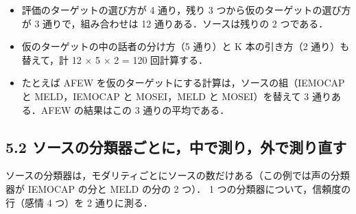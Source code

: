 \documentclass[a4paper,11pt]{ltjsarticle}
\begin{document}
\begin{itemize}
  \item 評価のターゲットの選び方が 4 通り，残り 3 つから仮のターゲットの選び方が 3 通りで，組み合わせは 12 通りある．ソースは残りの 2 つである．
  \item 仮のターゲットの中の話者の分け方（5 通り）と K 本の引き方（2 通り）も替えて，計 12 × 5 × 2 = 120 回計算する．
  \item たとえば AFEW を仮のターゲットにする計算は，ソースの組（IEMOCAP と MELD，IEMOCAP と MOSEI，MELD と MOSEI）を替えて 3 通りある．AFEW の結果はこの 3 通りの平均である．
\end{itemize}

\subsection*{5.2 ソースの分類器ごとに，中で測り，外で測り直す}

ソースの分類器は，モダリティごとにソースの数だけある（この例では声の分類器が IEMOCAP の分と MELD の分の 2 つ）．
1 つの分類器について，信頼度の行（感情 4 つ）を 2 通りに測る．
\end{document}
